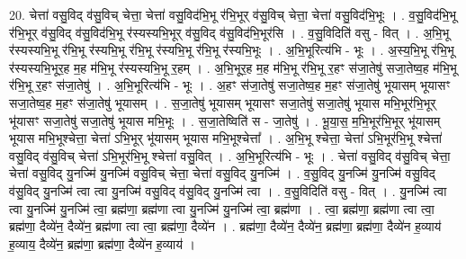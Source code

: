 \documentclass[17pt]{extarticle}
\begin{document}
20. चेत्ता॑ वसु॒विद् व॑सु॒विच् चेत्ता॒ चेत्ता॑ वसु॒विद॑भि॒भू र॑भि॒भूर् व॑सु॒विच् चेत्ता॒ चेत्ता॑ वसु॒विद॑भि॒भूः । . व॒सु॒विद॑भि॒भू र॑भि॒भूर् व॑सु॒विद् व॑सु॒विद॑भि॒भू र॑स्यस्यभि॒भूर् व॑सु॒विद् व॑सु॒विद॑भि॒भूर॑सि । . व॒सु॒विदिति॑ वसु - वित् । . अ॒भि॒भू र॑स्यस्यभि॒भू र॑भि॒भू र॑स्यभि॒भू र॑भि॒भू र॑स्यभि॒भू र॑भि॒भू र॑स्यभि॒भूः । . अ॒भि॒भूरित्य॑भि - भूः । . अ॒स्य॒भि॒भू र॑भि॒भू र॑स्यस्यभि॒भूर॒ह म॒ह म॑भि॒भू र॑स्यस्यभि॒भू र॒हम् । . अ॒भि॒भूर॒ह म॒ह म॑भि॒भू र॑भि॒भू र॒हꣳ स॑जा॒तेषु॑ सजा॒तेष्व॒ह म॑भि॒भू र॑भि॒भू र॒हꣳ स॑जा॒तेषु॑ । . अ॒भि॒भूरित्य॑भि - भूः । . अ॒हꣳ स॑जा॒तेषु॑ सजा॒तेष्व॒ह म॒हꣳ स॑जा॒तेषु॑ भूयासम् भूयासꣳ सजा॒तेष्व॒ह म॒हꣳ स॑जा॒तेषु॑ भूयासम् । . स॒जा॒तेषु॑ भूयासम् भूयासꣳ सजा॒तेषु॑ सजा॒तेषु॑ भूयास मभि॒भूर॑भि॒भूर् भू॑यासꣳ सजा॒तेषु॑ सजा॒तेषु॑ भूयास मभि॒भूः । . स॒जा॒तेष्विति॑ स - जा॒तेषु॑ । . भू॒या॒स॒ म॒भि॒भूर॑भि॒भूर् भू॑यासम् भूयास मभि॒भूश्चेत्ता॒ चेत्ता॑ ऽभि॒भूर् भू॑यासम् भूयास मभि॒भूश्चेत्ता᳚ । . अ॒भि॒भू श्चेत्ता॒ चेत्ता॑ ऽभि॒भूर॑भि॒भू श्चेत्ता॑ वसु॒विद् व॑सु॒विच् चेत्ता॑ ऽभि॒भूर॑भि॒भू श्चेत्ता॑ वसु॒वित् । . अ॒भि॒भूरित्य॑भि - भूः । . चेत्ता॑ वसु॒विद् व॑सु॒विच् चेत्ता॒ चेत्ता॑ वसु॒विद् यु॒नज्मि॑ यु॒नज्मि॑ वसु॒विच् चेत्ता॒ चेत्ता॑ वसु॒विद् यु॒नज्मि॑ । . व॒सु॒विद् यु॒नज्मि॑ यु॒नज्मि॑ वसु॒विद् व॑सु॒विद् यु॒नज्मि॑ त्वा त्वा यु॒नज्मि॑ वसु॒विद् व॑सु॒विद् यु॒नज्मि॑ त्वा । . व॒सु॒विदिति॑ वसु - वित् । . यु॒नज्मि॑ त्वा त्वा यु॒नज्मि॑ यु॒नज्मि॑ त्वा॒ ब्रह्म॑णा॒ ब्रह्म॑णा त्वा यु॒नज्मि॑ यु॒नज्मि॑ त्वा॒ ब्रह्म॑णा । . त्वा॒ ब्रह्म॑णा॒ ब्रह्म॑णा त्वा त्वा॒ ब्रह्म॑णा॒ दैव्ये॑न॒ दैव्ये॑न॒ ब्रह्म॑णा त्वा त्वा॒ ब्रह्म॑णा॒ दैव्ये॑न । . ब्रह्म॑णा॒ दैव्ये॑न॒ दैव्ये॑न॒ ब्रह्म॑णा॒ ब्रह्म॑णा॒ दैव्ये॑न ह॒व्याय॑ ह॒व्याय॒ दैव्ये॑न॒ ब्रह्म॑णा॒ ब्रह्म॑णा॒ दैव्ये॑न ह॒व्याय॑ । \newline
\end{document}
